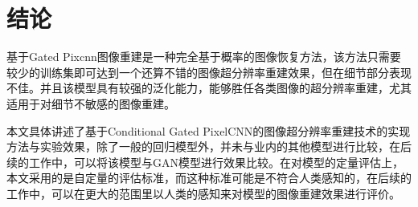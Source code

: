 \section{结论}

基于Gated Pixcnn图像重建是一种完全基于概率的图像恢复方法，该方法只需要较少的训练集即可达到一个还算不错的图像超分辨率重建效果，但在细节部分表现不佳。并且该模型具有较强的泛化能力，能够胜任各类图像的超分辨率重建，尤其适用于对细节不敏感的图像重建。

本文具体讲述了基于Conditional Gated PixelCNN的图像超分辨率重建技术的实现方法与实验效果，除了一般的回归模型外，并未与业内的其他模型进行比较，在后续的工作中，可以将该模型与GAN模型进行效果比较。在对模型的定量评估上，本文采用的是自定量的评估标准，而这种标准可能是不符合人类感知的，在后续的工作中，可以在更大的范围里以人类的感知来对模型的图像重建效果进行评价。
